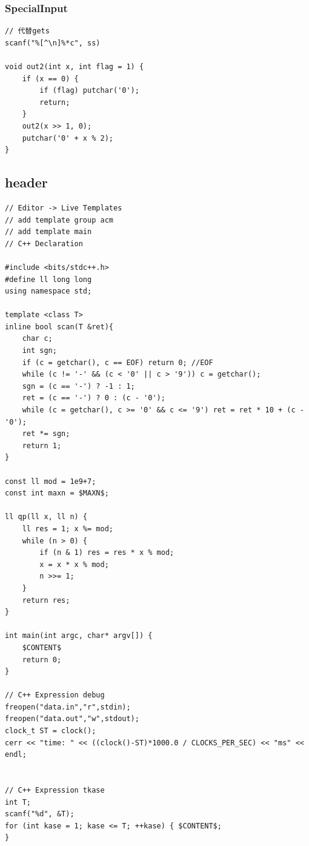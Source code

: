 \documentclass[twoside]{article}
\begin{document}
\subsubsection{SpecialInput}
\begin{lstlisting}
// 代替gets
scanf("%[^\n]%*c", ss)

void out2(int x, int flag = 1) {
    if (x == 0) {
        if (flag) putchar('0');
        return;
    }
    out2(x >> 1, 0);
    putchar('0' + x % 2);
}\end{lstlisting}
\subsection{header}
\begin{lstlisting}
// Editor -> Live Templates
// add template group acm
// add template main
// C++ Declaration

#include <bits/stdc++.h>
#define ll long long
using namespace std;

template <class T>
inline bool scan(T &ret){
    char c;
    int sgn;
    if (c = getchar(), c == EOF) return 0; //EOF
    while (c != '-' && (c < '0' || c > '9')) c = getchar();
    sgn = (c == '-') ? -1 : 1;
    ret = (c == '-') ? 0 : (c - '0');
    while (c = getchar(), c >= '0' && c <= '9') ret = ret * 10 + (c - '0');
    ret *= sgn;
    return 1;
}

const ll mod = 1e9+7;
const int maxn = $MAXN$;

ll qp(ll x, ll n) {
    ll res = 1; x %= mod;
    while (n > 0) {
        if (n & 1) res = res * x % mod;
        x = x * x % mod;
        n >>= 1;
    }
    return res;
}

int main(int argc, char* argv[]) {
    $CONTENT$
    return 0;
}

// C++ Expression debug
freopen("data.in","r",stdin);
freopen("data.out","w",stdout);
clock_t ST = clock();
cerr << "time: " << ((clock()-ST)*1000.0 / CLOCKS_PER_SEC) << "ms" << endl;


// C++ Expression tkase
int T;
scanf("%d", &T);
for (int kase = 1; kase <= T; ++kase) { $CONTENT$;
}\end{lstlisting}
\end{document}
